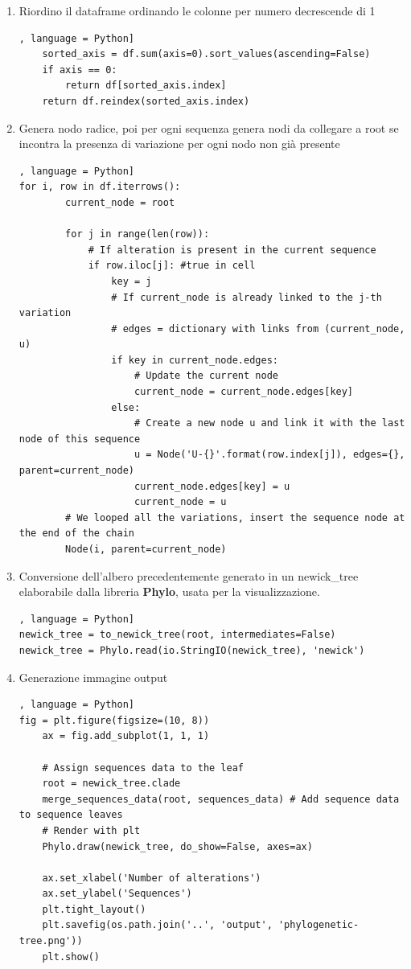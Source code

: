 \documentclass[11pt,italian]{article}
\begin{document}
\begin{enumerate}
	\item Riordino il dataframe ordinando le colonne per numero decrescende di 1
\begin{lstlisting}[basicstyle=\small\ttfamily,caption=Porzione di ciclo,label=code:1 = [], language = Python]	
    sorted_axis = df.sum(axis=0).sort_values(ascending=False)
    if axis == 0:
        return df[sorted_axis.index]
    return df.reindex(sorted_axis.index)
\end{lstlisting}
	\item Genera nodo radice, poi per ogni sequenza genera nodi da collegare a root se incontra la presenza di variazione per ogni nodo non già presente
\begin{lstlisting}[basicstyle=\small\ttfamily,caption=Porzione di ciclo,label=code:1 = [], language = Python]	
for i, row in df.iterrows():
        current_node = root

        for j in range(len(row)):
            # If alteration is present in the current sequence
            if row.iloc[j]: #true in cell
                key = j
                # If current_node is already linked to the j-th variation
                # edges = dictionary with links from (current_node, u)
                if key in current_node.edges:
                    # Update the current node
                    current_node = current_node.edges[key]
                else:
                    # Create a new node u and link it with the last node of this sequence
                    u = Node('U-{}'.format(row.index[j]), edges={}, parent=current_node)
                    current_node.edges[key] = u
                    current_node = u
        # We looped all the variations, insert the sequence node at the end of the chain
        Node(i, parent=current_node)	
\end{lstlisting}
\item Conversione dell'albero precedentemente generato in un newick\_tree elaborabile dalla libreria \textbf{Phylo}, usata per la visualizzazione.
\begin{lstlisting}[basicstyle=\small\ttfamily,caption=Porzione di ciclo,label=code:1 = [], language = Python]	
newick_tree = to_newick_tree(root, intermediates=False)
newick_tree = Phylo.read(io.StringIO(newick_tree), 'newick')
\end{lstlisting}
\item Generazione immagine output
\begin{lstlisting}[basicstyle=\small\ttfamily,caption=Porzione di ciclo,label=code:1 = [], language = Python]	
fig = plt.figure(figsize=(10, 8))
    ax = fig.add_subplot(1, 1, 1)

    # Assign sequences data to the leaf
    root = newick_tree.clade
    merge_sequences_data(root, sequences_data) # Add sequence data to sequence leaves
    # Render with plt
    Phylo.draw(newick_tree, do_show=False, axes=ax)

    ax.set_xlabel('Number of alterations')
    ax.set_ylabel('Sequences')
    plt.tight_layout()
    plt.savefig(os.path.join('..', 'output', 'phylogenetic-tree.png'))
    plt.show()
\end{lstlisting}
\end{enumerate}
\end{document}
